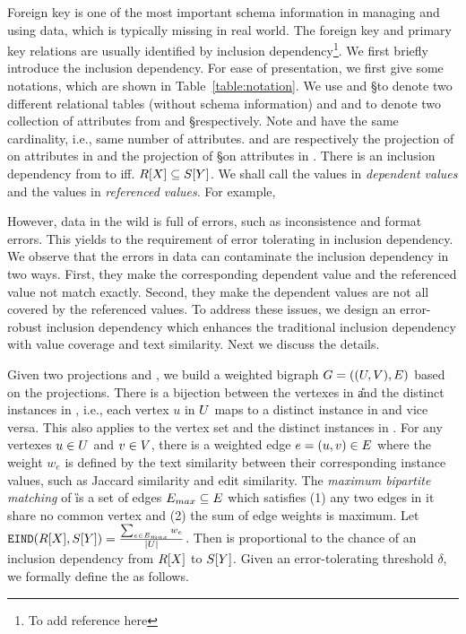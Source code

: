 Foreign key is one of the most important schema information in managing and using data, which is typically missing in real world. The foreign key and primary key relations are usually identified by inclusion dependency\footnote{To add reference here}. We first briefly introduce the inclusion dependency. For ease of presentation, we first give some notations, which are shown in Table~\ref{table:notation}. We use \R and \S to denote two different relational tables (without schema information) and \X and \Y to denote two collection of attributes from \R and \S respectively. Note \X and \Y have the same cardinality, i.e., same number of attributes. \RX and \SY are respectively the projection of \R on attributes in \X and the projection of \S on attributes in \Y. There is an inclusion dependency from \X to \Y iff. $R[X]\subseteq S[Y]$. We shall call the values in \RX \emph{dependent values} and the values in \SY \emph{referenced values}. For example, 

However, data in the wild is full of errors, such as inconsistence and format errors. This yields to the requirement of error tolerating in inclusion dependency. We observe that the errors in data can contaminate the inclusion dependency in two ways. First, they make the corresponding dependent value and the referenced value not match exactly. Second, they make the dependent values are not all covered by the referenced values. To address these issues, we design an error-robust inclusion dependency which enhances the traditional inclusion dependency with value coverage and text similarity. Next we discuss the details.


Given two projections \RX and \SY, we build a weighted bigraph $G=((U,V),E)$ based on the projections. There is a bijection between the vertexes in \U and the distinct instances in \RX, i.e., each vertex $u$ in $U$ maps to a distinct instance in \RX and vice versa. This also applies to the vertex set \V and the distinct instances in \SY. For any vertexes $u\in U$ and $v\in V$, there is a weighted edge $e=(u,v)\in E$ where the weight $w_e$ is defined by the text similarity between their corresponding instance values, such as Jaccard similarity and edit similarity. The \emph{maximum bipartite matching} of \G is a set of edges $E_{max}\subseteq E$ which satisfies (1) any two edges in it share no common vertex and (2) the sum of edge weights is maximum. Let $\texttt{EIND}(R[X],S[Y])=\frac{\sum_{e\in E_{max}}w_e}{|U|}$. Then \EIND is proportional to the chance of an inclusion dependency from $R[X]$ to $S[Y]$. Given an error-tolerating threshold $\delta$, we formally define the \eind as follows.

